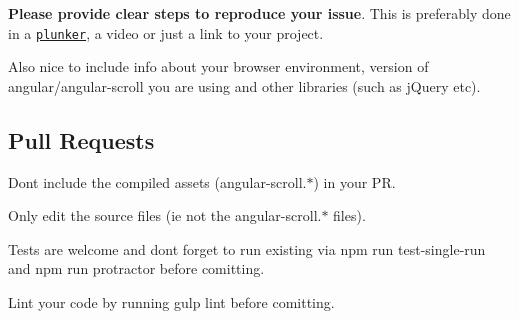 {\bfseries Please provide clear steps to reproduce your issue}. This is preferably done in a \href{http://plnkr.co/}{\tt plunker}, a video or just a link to your project.

Also nice to include info about your browser environment, version of angular/angular-\/scroll you are using and other libraries (such as j\+Query etc).

\subsection*{Pull Requests }


\begin{DoxyItemize}
\item Don\textquotesingle{}t include the compiled assets ({\ttfamily angular-\/scroll.$\ast$}) in your PR.
\item Only edit the source files (ie not the {\ttfamily angular-\/scroll.$\ast$} files).
\item Tests are welcome and don\textquotesingle{}t forget to run existing via {\ttfamily npm run test-\/single-\/run} and {\ttfamily npm run protractor} before comitting.
\item Lint your code by running {\ttfamily gulp lint} before comitting. 
\end{DoxyItemize}